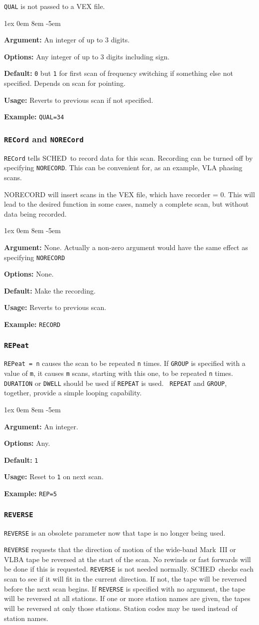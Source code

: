 \documentclass{report}
\newcommand{\schedb}{{\sc SCHED~}}
\newcommand{\rcwbox}[5]{
  \begin{list}{}{\parsep 1ex  \itemsep 0em
                 \leftmargin 8em  \itemindent -5em }
    \item {\bf Argument:} #1
    \item {\bf Options:}  #2
    \item {\bf Default:}  #3
    \item {\bf Usage:}    #4
    \item {\bf Example:}  #5
  \end{list}
}
\begin{document}
{\tt QUAL} is not passed to a VEX file.

\rcwbox
{An integer of up to 3 digits.}
{Any integer of up to 3 digits including sign.}
{{\tt 0} but {\tt 1} for first scan of frequency switching if
something else not specified. Depends on scan for pointing.}
{Reverts to previous scan if not specified.}
{{\tt QUAL=34}}


\subsubsection{\label{MP:RECORD}{\tt RECord} and {\tt NORECord}}

{\tt RECord} tells \schedb to record data for
this scan.  Recording can be turned off by specifying {\tt NORECORD}.
This can be convenient for, as an example, VLA phasing scans.

NORECORD will insert scans in the VEX file, which have recorder = 0.
This will lead to the desired function in some cases, namely a
complete scan, but without data being recorded.

\rcwbox
{None.  Actually a non-zero argument would have the same effect as
specifying {\tt NORECORD}}
{None.}
{Make the recording.}
{Reverts to previous scan.}
{{\tt RECORD}}


\subsubsection{\label{MP:REPEAT}{\tt REPeat}}

{\tt REPeat = n} causes the scan to be repeated {\tt n} times.  If
{\tt GROUP} is specified with a value of {\tt m}, it causes {\tt m}
scans, starting with this one, to be repeated {\tt n} times. {\tt
DURATION} or {\tt DWELL} should be used if {\tt REPEAT} is used. {\tt
REPEAT} and {\tt GROUP}, together, provide a simple looping
capability.

\rcwbox
{An integer.}
{Any.}
{{\tt 1}}
{Reset to {\tt 1} on next scan.}
{{\tt REP=5}}


\subsubsection{\label{MP:REVERSE}{\tt REVERSE}}

{\tt REVERSE} is an obsolete parameter now that tape is no longer
being used.

{\tt REVERSE} requests that the direction of motion of the
wide-band Mark~III or VLBA tape be reversed at the start of the
scan. No rewinds or fast forwards will be done if this is requested.
{\tt REVERSE} is not needed normally. \schedb checks each scan to
see if it will fit in the current direction. If not, the tape will be
reversed before the next scan begins.
If {\tt REVERSE} is specified with no argument, the tape will be
reversed at all stations. If one or more station names are given, the
tapes will be reversed at only those stations.  Station codes may
be used instead of station names.
\end{document}
